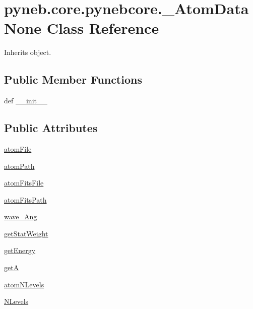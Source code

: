 \hypertarget{classpyneb_1_1core_1_1pynebcore_1_1___atom_data_none}{\section{pyneb.\-core.\-pynebcore.\-\_\-\-Atom\-Data\-None Class Reference}
\label{classpyneb_1_1core_1_1pynebcore_1_1___atom_data_none}
}


Inherits object.

\subsection*{Public Member Functions}
\begin{DoxyCompactItemize}
\item 
def \hyperlink{classpyneb_1_1core_1_1pynebcore_1_1___atom_data_none_a07f02d091d31fdfdc4e58b6357be5bb7}{\-\_\-\-\_\-init\-\_\-\-\_\-}
\end{DoxyCompactItemize}
\subsection*{Public Attributes}
\begin{DoxyCompactItemize}
\item 
\hyperlink{classpyneb_1_1core_1_1pynebcore_1_1___atom_data_none_a0b4acd0c49278c6b3ac0fa460ad33bb9}{atom\-File}
\item 
\hyperlink{classpyneb_1_1core_1_1pynebcore_1_1___atom_data_none_aa255a7f490aa5d1cf7cfee7c5eb388ae}{atom\-Path}
\item 
\hyperlink{classpyneb_1_1core_1_1pynebcore_1_1___atom_data_none_af853b15fb8cb15c2781dedc2cac7f3a3}{atom\-Fits\-File}
\item 
\hyperlink{classpyneb_1_1core_1_1pynebcore_1_1___atom_data_none_ad9df42301b90127f83be1381a302f57b}{atom\-Fits\-Path}
\item 
\hyperlink{classpyneb_1_1core_1_1pynebcore_1_1___atom_data_none_a6a6e8b052741d46963b85c0cdcb9fd79}{wave\-\_\-\-Ang}
\item 
\hyperlink{classpyneb_1_1core_1_1pynebcore_1_1___atom_data_none_a45c07931f008fd0cfc0349222b14cd8c}{get\-Stat\-Weight}
\item 
\hyperlink{classpyneb_1_1core_1_1pynebcore_1_1___atom_data_none_ace59c545d211f79753ebdc9414eb1824}{get\-Energy}
\item 
\hyperlink{classpyneb_1_1core_1_1pynebcore_1_1___atom_data_none_a44aa15dc5314c07627944e86581631b1}{get\-A}
\item 
\hyperlink{classpyneb_1_1core_1_1pynebcore_1_1___atom_data_none_a3bc65b4742319ce5123d6fd3ca977c63}{atom\-N\-Levels}
\item 
\hyperlink{classpyneb_1_1core_1_1pynebcore_1_1___atom_data_none_a784a8906a9fd1b408b567989207aca84}{N\-Levels}
\end{DoxyCompactItemize}


